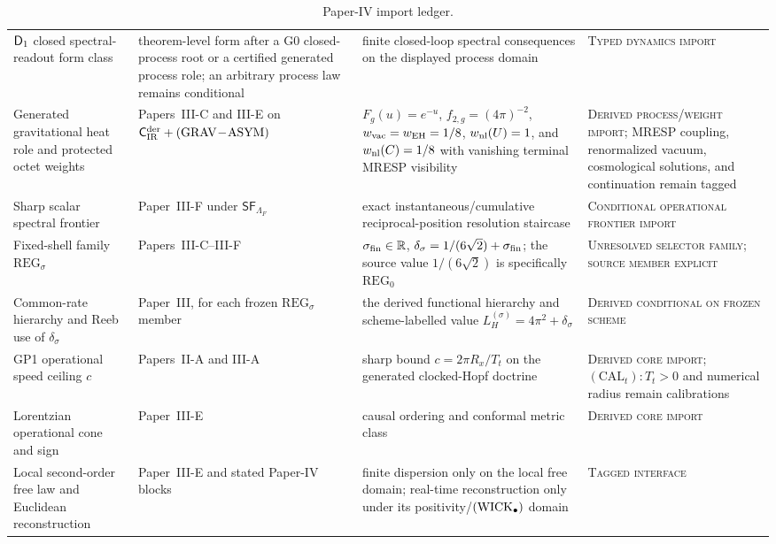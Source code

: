 \documentclass[12pt,a4paper]{article}
\begin{document}
\begin{table}[H]
\begin{tabular}{@{}L{3.0cm}L{3.4cm}L{4.4cm}L{3.0cm}@{}}
\(\mathsf{D}_1\) closed spectral-readout form class & theorem-level form after a G0 closed-process root or a certified generated process role; an arbitrary process law remains conditional & finite closed-loop spectral consequences on the displayed process domain & \textsc{Typed dynamics import} \\
Generated gravitational heat role and protected octet weights & Papers~III-C and III-E on
\(\mathsf C_{\rm IR}^{\rm der}+(\mathrm{GRAV\!-\!ASYM})\) &
\(F_g(u)=e^{-u}\), \(f_{2,g}=(4\pi)^{-2}\),
\(w_{\rm vac}=w_{\rm EH}=1/8\), \(w_{\rm nl}(U)=1\), and
\(w_{\rm nl}(C)=1/8\) with vanishing terminal MRESP visibility &
\textsc{Derived process/weight import}; MRESP coupling, renormalized vacuum,
cosmological solutions, and continuation remain tagged \\
Sharp scalar spectral frontier & Paper~III-F under
\(\mathsf{SF}_{\Lambda_F}\) & exact instantaneous/cumulative
reciprocal-position resolution staircase & \textsc{Conditional operational
frontier import} \\
Fixed-shell family \(\mathrm{REG}_\sigma\) & Papers~III-C--III-F &
\(\sigma_{\rm fin}\in\mathbb R\),
\(\delta_\sigma=1/(6\sqrt2)+\sigma_{\rm fin}\); the source value
\(1/(6\sqrt2)\) is specifically \(\mathrm{REG}_0\) &
\textsc{Unresolved selector family; source member explicit} \\
Common-rate hierarchy and Reeb use of \(\delta_\sigma\) & Paper~III, for each frozen \(\mathrm{REG}_\sigma\) member & the derived functional hierarchy and scheme-labelled value \(L_H^{(\sigma)}=4\pi^2+\delta_\sigma\) & \textsc{Derived conditional on frozen scheme} \\
GP1 operational speed ceiling \(c\) & Papers~II-A and III-A & sharp bound \(c=2\pi R_x/T_t\) on the generated clocked-Hopf doctrine & \textsc{Derived core import}; \((\mathrm{CAL}_t):T_t>0\) and numerical radius remain calibrations \\
Lorentzian operational cone and sign & Paper~III-E & causal ordering and conformal metric class & \textsc{Derived core import} \\
Local second-order free law and Euclidean reconstruction & Paper~III-E and stated Paper-IV blocks & finite dispersion only on the local free domain; real-time reconstruction only under its positivity/\(({\rm WICK}_\bullet)\) domain & \textsc{Tagged interface} \\
\bottomrule
\end{tabular}
\caption[Paper-IV import ledger]{Paper-IV import ledger.}
\label{tab:p4-framework-import-ledger}
\endgroup
\end{table}
\end{document}
